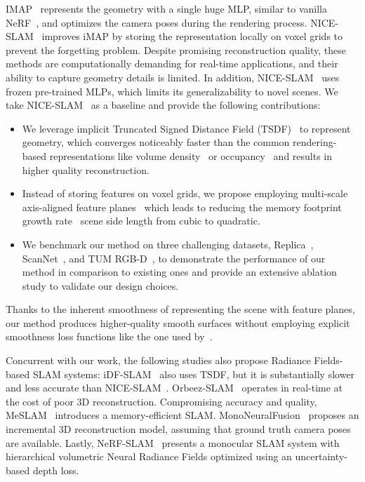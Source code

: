 IMAP~\citep{sucar2021imap} represents the geometry with a single huge MLP, similar to vanilla NeRF~\citep{mildenhall2020nerf}, and optimizes the camera poses during the rendering process. NICE-SLAM~\citep{zhu2022nice} improves iMAP by storing the representation locally on voxel grids to prevent the forgetting problem. Despite promising reconstruction quality, these methods are computationally demanding for real-time applications, and their ability to capture geometry details is limited. In addition, NICE-SLAM~\citep{zhu2022nice} uses frozen pre-trained MLPs, which limits its generalizability to novel scenes. We take NICE-SLAM~\citep{zhu2022nice} as a baseline and provide the following contributions:
\begin{itemize}
	\item We leverage implicit Truncated Signed Distance Field (TSDF)~\citep{azinovic2022neural} to represent geometry, which converges noticeably faster than the common rendering-based representations like volume density~\citep{sucar2021imap} or occupancy~\citep{zhu2022nice} and results in higher quality reconstruction.
	
	\item Instead of storing features on voxel grids, we propose employing multi-scale axis-aligned feature planes~\citep{chan2022efficient} which leads to reducing the memory footprint growth rate \wrt~scene side length from cubic to quadratic.
	
	\item We benchmark our method on three challenging datasets, Replica~\citep{replica19arxiv}, ScanNet~\citep{dai2017scannet}, and TUM RGB-D~\citep{sturm2012benchmark}, to demonstrate the performance of our method in comparison to existing ones and provide an extensive ablation study to validate our design choices.
	
\end{itemize}
Thanks to the inherent smoothness of representing the scene with feature planes, our method produces higher-quality smooth surfaces without employing explicit smoothness loss functions like the one used by~\cite{wang2022go}.

Concurrent with our work, the following studies also propose Radiance Fields-based SLAM systems: iDF-SLAM~\citep{ming2022idf} also uses TSDF, but it is substantially slower and less accurate than NICE-SLAM~\citep{zhu2022nice}. Orbeez-SLAM~\citep{chung2023orbeez} operates in real-time at the cost of poor 3D reconstruction. Compromising accuracy and quality, MeSLAM~\citep{kruzhkov2022meslam} introduces a memory-efficient SLAM. MonoNeuralFusion~\citep{zou2022mononeuralfusion} proposes an incremental 3D reconstruction model, assuming that ground truth camera poses are available. Lastly, NeRF-SLAM~\citep{rosinol2023nerf} presents a monocular SLAM system with hierarchical volumetric Neural Radiance Fields optimized using an uncertainty-based depth loss.

